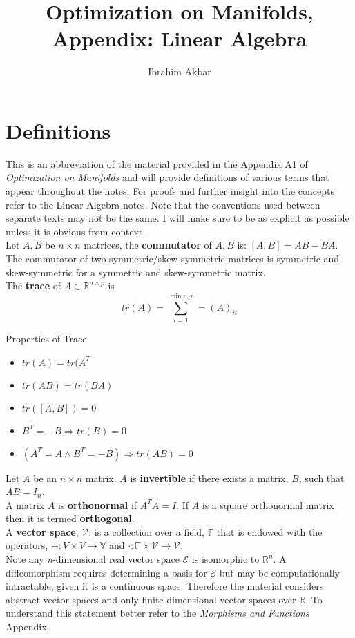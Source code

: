 \documentclass[a4paper]{article}
\begin{document}
\title{Optimization on Manifolds, Appendix: Linear Algebra}
\author{Ibrahim Akbar}
\maketitle

\section{Definitions}

This is an abbreviation of the material provided in the Appendix A1 of \textit{Optimization on Manifolds} and will provide definitions of various terms that appear throughout the notes. For proofs and further insight into the concepts refer to the Linear Algebra notes. Note that the conventions used between separate texts may not be the same. I will make sure to be as explicit as possible unless it is obvious from context.\\

\noindent Let $A,B$ be $n\times n$ matrices, the \textbf{commutator} of $A,B$ is: $[A,B] = AB - BA$.\\
\noindent The commutator of two symmetric/skew-symmetric matrices is symmetric and skew-symmetric for a symmetric and skew-symmetric matrix.\\

\noindent The \textbf{trace} of $A\in\mathbb{R}^{n\times p}$ is
$$
tr(A) = \sum_{i=1}^{\min{n,p}} = (A)_{ii}
$$

\noindent Properties of Trace
\begin{itemize}
\item $tr(A) = tr(A^{T}$
\item $tr(AB) = tr(BA)$
\item $tr([A,B]) = 0$
\item $B^{T} = -B\Rightarrow tr(B) = 0$
\item $(A^{T} = A \land B^{T} = -B)\Rightarrow tr(AB) = 0$
\end{itemize}

\noindent Let $A$ be an $n\times n$ matrix. $A$ is \textbf{invertible} if there exists a matrix, $B$, such that $AB = I_{n}$.\\

\noindent A matrix $A$ is \textbf{orthonormal} if $A^{T}A = I$. If $A$ is a square orthonormal matrix then it is termed \textbf{orthogonal}.\\

\noindent A \textbf{vector space}, $\mathcal{V}$, is a collection over a field, $\mathbb{F}$ that is endowed with the operators,  $+:V\times V\rightarrow\mathbb{V}$ and $\cdot:\mathbb{F}\times\mathcal{V}\rightarrow\mathcal{V}$.\\
Note any \textit{n}-dimensional real vector space $\mathcal{E}$ is isomorphic to $\mathbb{R}^{n}$. A diffeomorphism requires determining a basis for $\mathcal{E}$ but may be computationally intractable, given it is a continuous space.
Therefore the material considers abstract vector spaces and only finite-dimensional vector spaces over $\mathbb{R}$. To understand this statement better refer to the \textit{Morphisms and Functions} Appendix.\\
\end{document}
